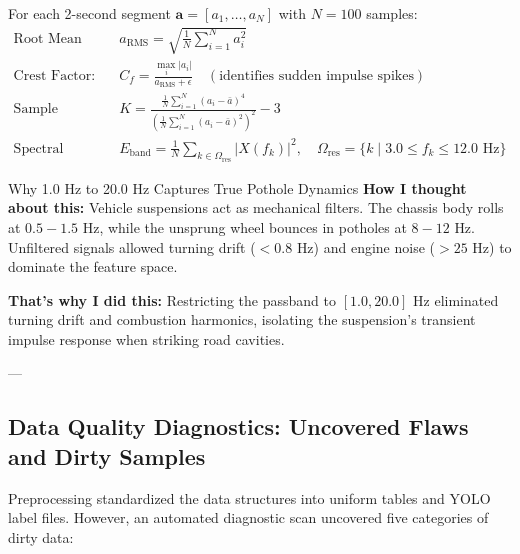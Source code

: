 For each 2-second segment $\mathbf{a} = [a_1, \dots, a_N]$ with $N=100$ samples:
\begin{align}
\text{Root Mean Square (RMS):} \quad & a_{\text{RMS}} = \sqrt{\frac{1}{N}\sum_{i=1}^N a_i^2} \\
\text{Crest Factor:} \quad & C_f = \frac{\max_{i} |a_i|}{a_{\text{RMS}} + \epsilon} \quad (\text{identifies sudden impulse spikes}) \\
\text{Sample Kurtosis:} \quad & K = \frac{\frac{1}{N}\sum_{i=1}^N (a_i - \bar{a})^4}{\left(\frac{1}{N}\sum_{i=1}^N (a_i - \bar{a})^2\right)^2} - 3 \\
\text{Spectral Energy (3--12 Hz):} \quad & E_{\text{band}} = \frac{1}{N}\sum_{k \in \Omega_{\text{res}}} |X(f_k)|^2, \quad \Omega_{\text{res}} = \{k \mid 3.0 \le f_k \le 12.0\text{ Hz}\}
\end{align}

\begin{designreflection}{Why 1.0 Hz to 20.0 Hz Captures True Pothole Dynamics}
\textbf{How I thought about this:}
Vehicle suspensions act as mechanical filters. The chassis body rolls at $0.5 - 1.5\text{ Hz}$, while the unsprung wheel bounces in potholes at $8 - 12\text{ Hz}$. Unfiltered signals allowed turning drift ($< 0.8\text{ Hz}$) and engine noise ($> 25\text{ Hz}$) to dominate the feature space.

\textbf{That's why I did this:}
Restricting the passband to $[1.0, 20.0]\text{ Hz}$ eliminated turning drift and combustion harmonics, isolating the suspension's transient impulse response when striking road cavities.
\end{designreflection}

---

\subsection{Data Quality Diagnostics: Uncovered Flaws and Dirty Samples}
Preprocessing standardized the data structures into uniform tables and YOLO label files. However, an automated diagnostic scan uncovered five categories of dirty data:


